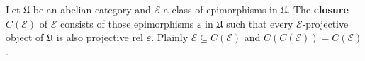 Let $\mathfrak{U}$ be an abelian category and $\mathcal{E}$ a class of epimorphisms in $\mathfrak{U}$. The \textbf{closure} $C(\mathcal{E})$ of $\mathcal{E}$ consists of those epimorphisms $\varepsilon$ in $\mathfrak{U}$ such that every $\mathcal{E}$-projective object of $\mathfrak{U}$ is also projective rel $\varepsilon$. Plainly $\mathcal{E} \subseteq C(\mathcal{E})$ and $C(C(\mathcal{E})) = C(\mathcal{E})$.
